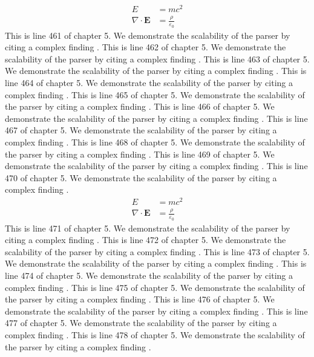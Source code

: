\begin{align*}
  E &= mc^2 \\
  \nabla \cdot \mathbf{E} &= \frac{\rho}{\varepsilon_0}
\end{align*}
This is line 461 of chapter 5. We demonstrate the scalability of the parser by citing a complex finding \cite{ref5_461}.
This is line 462 of chapter 5. We demonstrate the scalability of the parser by citing a complex finding \cite{ref5_462}.
This is line 463 of chapter 5. We demonstrate the scalability of the parser by citing a complex finding \cite{ref5_463}.
This is line 464 of chapter 5. We demonstrate the scalability of the parser by citing a complex finding \cite{ref5_464}.
This is line 465 of chapter 5. We demonstrate the scalability of the parser by citing a complex finding \cite{ref5_465}.
This is line 466 of chapter 5. We demonstrate the scalability of the parser by citing a complex finding \cite{ref5_466}.
This is line 467 of chapter 5. We demonstrate the scalability of the parser by citing a complex finding \cite{ref5_467}.
This is line 468 of chapter 5. We demonstrate the scalability of the parser by citing a complex finding \cite{ref5_468}.
This is line 469 of chapter 5. We demonstrate the scalability of the parser by citing a complex finding \cite{ref5_469}.
This is line 470 of chapter 5. We demonstrate the scalability of the parser by citing a complex finding \cite{ref5_470}.
\begin{align*}
  E &= mc^2 \\
  \nabla \cdot \mathbf{E} &= \frac{\rho}{\varepsilon_0}
\end{align*}
This is line 471 of chapter 5. We demonstrate the scalability of the parser by citing a complex finding \cite{ref5_471}.
This is line 472 of chapter 5. We demonstrate the scalability of the parser by citing a complex finding \cite{ref5_472}.
This is line 473 of chapter 5. We demonstrate the scalability of the parser by citing a complex finding \cite{ref5_473}.
This is line 474 of chapter 5. We demonstrate the scalability of the parser by citing a complex finding \cite{ref5_474}.
This is line 475 of chapter 5. We demonstrate the scalability of the parser by citing a complex finding \cite{ref5_475}.
This is line 476 of chapter 5. We demonstrate the scalability of the parser by citing a complex finding \cite{ref5_476}.
This is line 477 of chapter 5. We demonstrate the scalability of the parser by citing a complex finding \cite{ref5_477}.
This is line 478 of chapter 5. We demonstrate the scalability of the parser by citing a complex finding \cite{ref5_478}.
